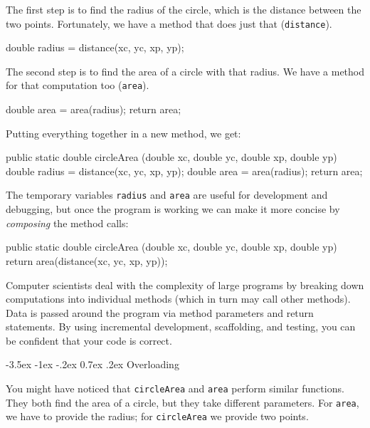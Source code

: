 \documentclass[12pt]{book}
\makeatletter
\theoremstyle{exercise}
\newcommand{\java}[1]{\verb"#1"}
\renewcommand{\section}{\@startsection {section}{1}{\z@}%
    {-3.5ex \@plus -1ex \@minus -.2ex}%
    {0.7ex \@plus.2ex}%
    {\normalfont\Large\bfseries}}
\newcommand{\java}[1]{\lstinline{#1}} %
\makeatother
\begin{document}
The first step is to find the radius of the circle, which is the distance between the two points.
Fortunately, we have a method that does just that (\java{distance}).


\begin{code}
    double radius = distance(xc, yc, xp, yp);
\end{code}

The second step is to find the area of a circle with that radius.
We have a method for that computation too (\java{area}).

\begin{code}
    double area = area(radius);
    return area;
\end{code}

Putting everything together in a new method, we get:

\begin{code}
    public static double circleArea
            (double xc, double yc, double xp, double yp) {
        double radius = distance(xc, yc, xp, yp);
        double area = area(radius);
        return area;
    }
\end{code}

The temporary variables \java{radius} and \java{area} are useful for development and debugging, but once the program is working we can make it more concise by {\it composing} the method calls:

\begin{code}
    public static double circleArea
            (double xc, double yc, double xp, double yp) {
        return area(distance(xc, yc, xp, yp));
    }
\end{code}

Computer scientists deal with the complexity of large programs by breaking down computations into individual methods (which in turn may call other methods).
Data is passed around the program via method parameters and return statements.
By using incremental development, scaffolding, and testing, you can be confident that your code is correct.


\section{Overloading}
\label{overloading}

You might have noticed that \java{circleArea} and \java{area} perform similar functions.
They both find the area of a circle, but they take different parameters.
For \java{area}, we have to provide the radius; for \java{circleArea} we provide two points.
\end{document}
